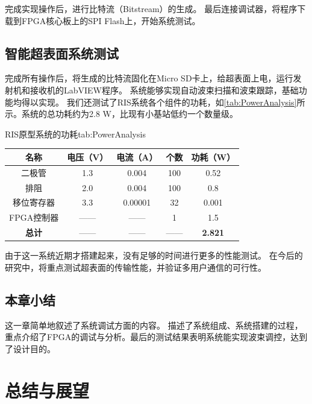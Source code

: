 \documentclass[supercite]{HustGraduPaper}
\begin{document}
完成实现操作后，进行比特流（Bitstream）的生成。
最后连接调试器，将程序下载到FPGA核心板上的SPI Flash上，开始系统测试。

\subsection{智能超表面系统测试}

完成所有操作后，将生成的比特流固化在Micro SD卡上，给超表面上电，运行发射机和接收机的LabVIEW程序。
系统能够实现自动波束扫描和波束跟踪，基础功能均得以实现。
我们还测试了RIS系统各个组件的功耗，如\autoref{tab:PowerAnalysis}所示。系统的总功耗约为2.8 W，比现有小基站低约一个数量级。

\begin{generaltab}{RIS原型系统的功耗}{tab:PowerAnalysis}
	\begin{tabular}{ccccc}
		\toprule
		名称             & 电压（V） & 电流（A） & 个数                      & 功耗（W）    \\ \midrule
		二极管           &  1.3     &  0.004    & 100 \footnotemark[1]     & 0.52         \\
		排阻             &  2.0     &  0.004    & 100 \footnotemark[1]     & 0.8          \\
		移位寄存器        &  3.3    &  0.00001  & 32                       & 0.001           \\
		FPGA控制器       &  ——      &   ——       &  1                      & 1.5         \\
		{\bfseries 总计}  &   ——     &    ——     &    ——                    & {\bfseries 2.821}       \\
		\bottomrule
	\end{tabular}
\end{generaltab}

由于这一系统近期才搭建起来，没有足够的时间进行更多的性能测试。
在今后的研究中，将重点测试超表面的传输性能，并验证多用户通信的可行性。

\subsection{本章小结}

这一章简单地叙述了系统调试方面的内容。
描述了系统组成、系统搭建的过程，重点介绍了FPGA的调试与分析。最后的测试结果表明系统能实现波束调控，达到了设计目的。

\section{总结与展望}\label{sec:conclusion}
\end{document}
